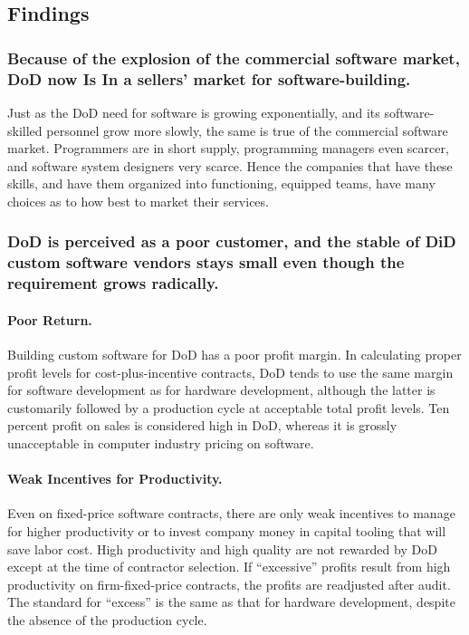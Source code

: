 \documentclass[12pt,final]{article}
\begin{document}
\subsection*{Findings}

\subsubsection*{Because of the explosion of the commercial software market, DoD
now Is In a sellers’ market for software-building.}

Just as the DoD need for software is growing exponentially, and its
software-skilled personnel grow more slowly, the same is true of the commercial
software market. Programmers are in short supply, programming managers even
scarcer, and software system designers very scarce. Hence the companies that
have these skills, and have them organized into functioning, equipped teams,
have many choices as to how best to market their services.

\subsubsection*{DoD is perceived as a poor customer, and the stable of DiD custom software
vendors stays small even though the requirement grows radically.}

\paragraph{Poor Return.} Building custom software for DoD has a poor profit
margin. In calculating proper profit levels for cost-plus-incentive contracts,
DoD tends to use the same margin for software development as for hardware
development, although the latter is customarily followed by a production cycle
at acceptable total profit levels. Ten percent profit on sales is considered
high in DoD, whereas it is grossly unacceptable in computer industry pricing on
software.

\paragraph{Weak Incentives for Productivity.}  Even on fixed-price software
contracts, there are only weak incentives to manage for higher productivity or
to invest company money in capital tooling that will save labor cost. High
productivity and high quality are not rewarded by DoD except at the time of
contractor selection. If “excessive” profits result from high productivity on
firm-fixed-price contracts, the profits are readjusted after audit. The
standard for “excess” is the same as that for hardware development, despite the
absence of the production cycle.
\end{document}
